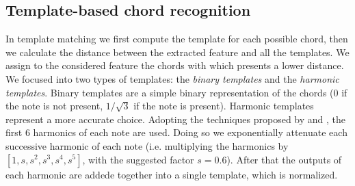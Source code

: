 \subsection{Template-based chord recognition}
\label{subsec:templates}

In template matching we first compute the template for each possible chord, then we calculate the distance between the extracted feature and all the templates. We assign to the considered feature the chords with which presents a lower distance. We focused into two types of templates: the \textit{binary templates} and the \textit{harmonic templates}. Binary templates are a simple binary representation of the chords (0 if the note is not present, $1/\sqrt{3}$ if the note is present). Harmonic templates represent a more accurate choice. Adopting the techniques proposed by \cite{gomez2006tonal} and \cite{oudre2009chord}, the first 6 harmonics of each note are used. Doing so we exponentially attenuate each successive harmonic of each note (i.e. multiplying the harmonics by $[1, s, s^2, s^3, s^4, s^5]$, with the suggested factor $s=0.6$). After that the outputs of each harmonic are addede together into a single template, which is normalized.
